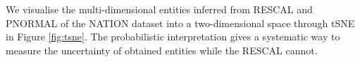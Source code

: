 We visualise the multi-dimensional entities inferred from RESCAL and PNORMAL of the NATION dataset into a two-dimensional space through tSNE \cite{VanDerMaaten2008} in Figure \ref{fig:tsne}. The probabilistic interpretation gives a systematic way to measure the uncertainty of obtained entities while the RESCAL cannot.
